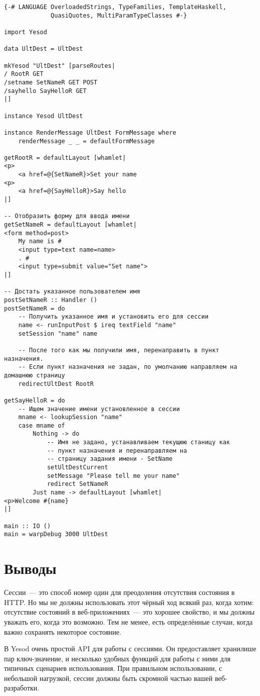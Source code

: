 \begin{lstlisting}
{-# LANGUAGE OverloadedStrings, TypeFamilies, TemplateHaskell,
             QuasiQuotes, MultiParamTypeClasses #-}

import Yesod

data UltDest = UltDest

mkYesod "UltDest" [parseRoutes|
/ RootR GET
/setname SetNameR GET POST
/sayhello SayHelloR GET
|]

instance Yesod UltDest

instance RenderMessage UltDest FormMessage where
    renderMessage _ _ = defaultFormMessage

getRootR = defaultLayout [whamlet|
<p>
    <a href=@{SetNameR}>Set your name
<p>
    <a href=@{SayHelloR}>Say hello
|]

-- Отобразить форму для ввода имени
getSetNameR = defaultLayout [whamlet|
<form method=post>
    My name is #
    <input type=text name=name>
    . #
    <input type=submit value="Set name">
|]

-- Достать указанное пользователем имя
postSetNameR :: Handler ()
postSetNameR = do
    -- Получить указанное имя и установить его для сессии
    name <- runInputPost $ ireq textField "name"
    setSession "name" name

    -- После того как мы получили имя, перенаправить в пункт назначения.
    -- Если пункт назначения не задан, по умолчанию направляем на домашнюю страницу
    redirectUltDest RootR

getSayHelloR = do
    -- Ищем значение имени установленное в сессии
    mname <- lookupSession "name"
    case mname of
        Nothing -> do
            -- Имя не задано, устанавливаем текущюю станицу как
            -- пункт назначения и перенаправляем на
            -- страницу задания имени - SetName 
            setUltDestCurrent
            setMessage "Please tell me your name"
            redirect SetNameR
        Just name -> defaultLayout [whamlet|
<p>Welcome #{name}
|]

main :: IO ()
main = warpDebug 3000 UltDest
\end{lstlisting}%

\section{Выводы}

Сессии~--- это способ номер один для преодоления отсутствия состояния в HTTP. Но мы не должны использовать этот чёрный ход всякий раз, когда хотим: отсутствие состояний в веб-приложениях~--- это хорошее свойство, и мы должны уважать его, когда это возможно. Тем не менее, есть определённые случаи, когда важно сохранять некоторое состояние. 

В Yesod очень простой API для работы с сессиями. Он предоставляет хранилише пар ключ-значение, и несколько удобных функций для работы с ними для типичных сценариев использования. При правильном использовании, с небольшой нагрузкой, сессии должны быть скромной частью вашей веб-разработки. 
